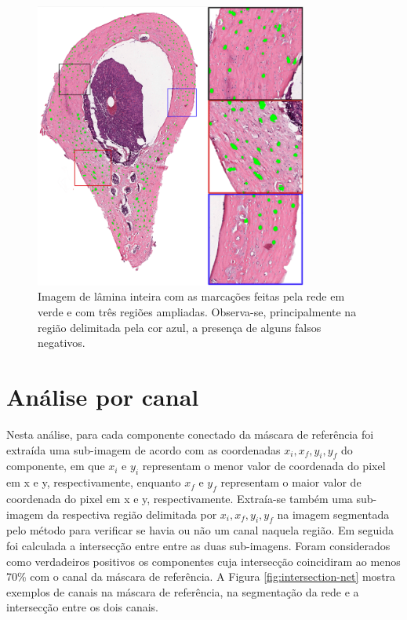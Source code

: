 \begin{figure}[H]
    \center
    \includegraphics[width=0.8\textwidth]{figures/4_results/302areas_reduzida.png}
   
  
    \caption[Imagem marcada pela rede com regiões ampliadas]{Imagem de lâmina inteira com as marcações feitas pela rede em verde e com três regiões ampliadas. Observa-se, principalmente na região delimitada pela cor azul, a presença de alguns falsos negativos.}
    \label{fig:marcacoes-final-regioes}
\end{figure}
\section{Análise por canal}

Nesta análise, para cada componente conectado da máscara de referência foi extraída uma sub-imagem de acordo com as coordenadas \(x_i, x_f, y_i, y_f\) do componente, em que $x_i$  e $y_i$ representam o menor valor de coordenada do pixel em x e y, respectivamente, enquanto $x_f$ e $y_f$ representam o maior valor de coordenada do pixel em x e y, respectivamente. Extraía-se também uma sub-imagem da respectiva região delimitada por \(x_i, x_f, y_i, y_f\) na imagem segmentada pelo método para verificar se havia ou não um canal naquela região. Em seguida foi calculada a intersecção entre entre as duas sub-imagens. Foram considerados como verdadeiros positivos os componentes cuja intersecção coincidiram ao menos 70\% com o canal da máscara de referência. A Figura \ref{fig:intersection-net} mostra exemplos de canais na máscara de referência, na segmentação da rede e a intersecção entre os dois canais. 

